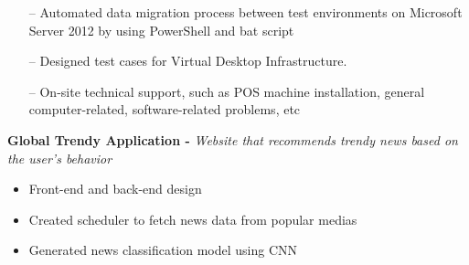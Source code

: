 \documentclass[10pt,a4paper]{altacv}
\begin{document}

\begin{itemize}
    \setlength{\itemindent}{0.5em}
    \item[--]   \small{Automated data migration process between test environments on Microsoft Server 2012 by using PowerShell and bat script}
    \item[--]   \small{Designed test cases for Virtual Desktop Infrastructure.}
    \item[--]   \small{On-site technical support, such as POS machine installation, general computer-related, software-related problems, etc}
\end{itemize}

\medskip




\textcolor{emphasis}{\textbf{Global Trendy Application -} \textit{Website that recommends trendy news based on the user’s behavior}} 

\begin{itemize}
\item Front-end and back-end design
\item Created scheduler to fetch news data from popular medias
\item Generated news classification model using CNN
\end{itemize}
\end{document}
